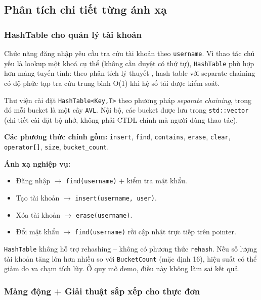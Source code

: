 \documentclass[12pt, a4paper]{article}
\begin{document}
\subsection{Phân tích chi tiết từng ánh xạ}

\subsubsection{HashTable cho quản lý tài khoản}

Chức năng đăng nhập yêu cầu tra cứu tài khoản theo \texttt{username}. Vì thao tác chủ yếu là
lookup một khoá cụ thể (không cần duyệt có thứ tự), \texttt{HashTable} phù hợp hơn mảng tuyến
tính: theo phân tích lý thuyết \cite{clrs}, hash table với separate chaining có độ phức tạp tra cứu
trung bình O(1) khi hệ số tải được kiểm soát.

Thư viện cài đặt \texttt{HashTable<Key,T>} theo phương pháp \emph{separate chaining}, trong đó
mỗi bucket là một cây \texttt{AVL}. Nội bộ, các bucket được lưu trong \texttt{std::vector}
(chi tiết cài đặt bộ nhớ, không phải CTDL chính mà người dùng thao tác).

\textbf{Các phương thức chính gồm:}
\texttt{insert}, \texttt{find}, \texttt{contains}, \texttt{erase}, \texttt{clear},
\texttt{operator[]}, \texttt{size}, \texttt{bucket\_count}.

\textbf{Ánh xạ nghiệp vụ:}
\begin{itemize}
  \item Đăng nhập $\rightarrow$ \texttt{find(username)} + kiểm tra mật khẩu.
  \item Tạo tài khoản $\rightarrow$ \texttt{insert(username, user)}.
  \item Xóa tài khoản $\rightarrow$ \texttt{erase(username)}.
  \item Đổi mật khẩu $\rightarrow$ \texttt{find(username)} rồi cập nhật trực tiếp trên pointer.
\end{itemize}

\begin{notebox}
  \texttt{HashTable} không hỗ trợ rehashing -- không có phương thức \texttt{rehash}.
  Nếu số lượng tài khoản tăng lớn hơn nhiều so với \texttt{BucketCount} (mặc định 16), hiệu
  suất có thể giảm do va chạm tích lũy. Ở quy mô demo, điều này không làm sai kết quả.
\end{notebox}

\subsubsection{Mảng động + Giải thuật sắp xếp cho thực đơn}
\end{document}

